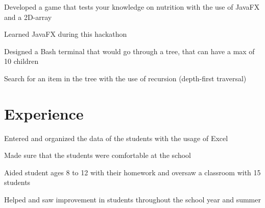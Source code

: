 \documentclass[]{deedy-resume-openfont}
\begin{document}
\begin{tightemize}
\item Developed a game that tests your knowledge on nutrition with the use of JavaFX and a 2D-array
\item  Learned JavaFX during this hackathon
\end{tightemize}
\sectionsep

\begin{tightemize}
\item Designed a Bash terminal that would go through a tree, that can have a max of 10 children
\item Search for an item in the tree with the use of recursion (depth-first traversal)
\end{tightemize}
\hline
\section{Experience}

\begin{tightemize}
\item Entered and organized the data of the students with the usage of Excel
\item Made sure that the students were comfortable at the school
\end{tightemize}
\sectionsep


\begin{tightemize}
\item Aided student ages 8 to 12 with their homework and oversaw a classroom with 15 students
\item Helped and saw improvement in students throughout the school year and summer
\end{tightemize}
\hline
\end{document}
